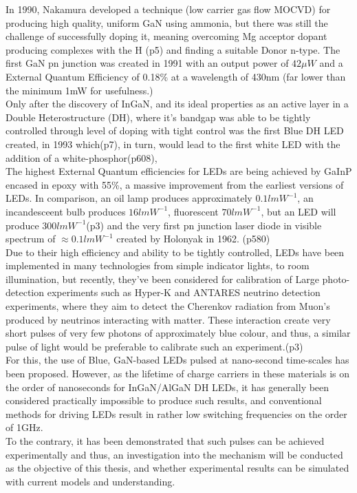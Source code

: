 \documentclass[titlepage]{article}
\begin{document}
In 1990, Nakamura developed a technique (low carrier gas flow MOCVD) for producing high quality, uniform GaN using ammonia, but there was still the challenge of successfully doping it, meaning overcoming Mg acceptor dopant producing complexes with the H \cite{Nakamura}(p5) and finding a suitable Donor n-type. The first GaN pn junction was created in 1991 with an output power of $42\mu W$ and a External Quantum Efficiency of 0.18\% at a wavelength of 430nm (far lower than the minimum 1mW for usefulness.) \\
Only after the discovery of InGaN, and its ideal properties as an active layer in a Double Heterostructure (DH), where it's bandgap was able to be tightly controlled through level of doping with tight control was the first Blue DH LED created, in 1993 which\cite{Nakamura}(p7), in turn, would lead to the first white LED with the addition of a white-phosphor\cite{Sze}(p608), \\The highest External Quantum efficiencies for LEDs are being achieved by GaInP encased in epoxy with 55\%,\cite{EQE} a massive improvement from the earliest versions of LEDs. In comparison, an oil lamp produces approximately $0.1lmW^{-1}$, an incandesceent bulb produces  $16lmW^{-1}$, fluorescent  $70lmW^{-1}$, but an LED will produce  $300lmW^{-1}$\cite{Nakamura}(p3) and the very first pn junction laser diode in visible spectrum of  $\approx 0.1lmW^{-1}$ created by Holonyak in 1962. \cite{Kittel}(p580)\\
Due to their high efficiency and ability to be tightly controlled, LEDs have been implemented in many technologies from simple indicator lights, to room illumination, but recently, they've been considered for calibration of Large photo-detection experiments such as Hyper-K and ANTARES neutrino detection experiments, where they aim to detect the Cherenkov radiation from Muon's produced by neutrinos interacting with matter. These interaction create very short pulses of very few photons of approximately blue colour, and thus, a similar pulse of light would be preferable to calibrate such an experiment.\cite{Veledar}(p3) \\
For this, the use of Blue, GaN-based LEDs pulsed at nano-second time-scales has been proposed. However, as the lifetime of charge carriers in these materials is on the order of nanoseconds for InGaN/AlGaN DH LEDs\cite{Brailovsky}, it has generally been considered practically impossible to produce such results, and conventional methods for driving LEDs result in rather low switching frequencies on the order of 1GHz. \\ To the contrary, it has been demonstrated that such pulses can be achieved experimentally \cite{Data} and thus, an investigation into the mechanism will be conducted as the objective of this thesis, and whether experimental results can be simulated with current models and understanding.
\end{document}
